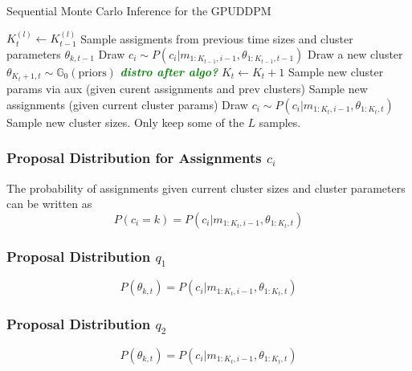 \documentclass[smallcondensed, final]{svjour3}
\newcommand{\willie}[1]{\textcolor{green}{\textsf{\emph{\textbf{\textcolor{green}{#1}}}}}}
\begin{document}
\begin{algorithm}
\caption{Sequential Monte Carlo Inference for the GPUDDPM}
\label{alg:SMC}
\begin{algorithmic}[1]
\STATE $K_{t}^{(l)}  \leftarrow K_{t-1}^{(l)}$
\STATE Sample assigments from previous time sizes and cluster parameters $\theta_{k,t-1}$
\STATE Draw $c_{i} \sim P(c_{i} | m_{1:K_{t-1}, i-1}, \theta_{1:K_{t-1}, t-1} )$
\STATE Draw a new cluster $\theta_{K_{t}+1,t} \sim \mathbb{G}_{0}(\text{priors})$   \willie{distro after algo?}
\STATE $K_{t} \leftarrow K_{t} + 1$
\ENDIF
\ENDFOR
{}
\STATE Sample new cluster params via aux (given curent assignments and prev clusters)
\ENDFOR
{}
\STATE Sample new assignments (given current cluster params)
\STATE Draw $c_{i} \sim P(c_{i} | m_{1:K_{t}, i-1}, \theta_{1:K_{t}, t} )$
\ENDFOR
\STATE Sample new cluster sizes.
\ENDFOR
\ENDFOR
\STATE Only keep some of the $L$ samples.
\ENDFOR
\end{algorithmic}
\end{algorithm}


\subsubsection{Proposal Distribution for Assignments $c_{i}$}
The probability of assignments given current cluster sizes and cluster parameters can be written as
\begin{equation}
P(c_{i} = k) = P(c_{i} | m_{1:K_{t}, i-1}, \theta_{1:K_{t}, t} )
\end{equation}


\subsubsection{Proposal Distribution $q_{1}$}

\begin{equation}
P(\theta_{k,t}) = P(c_{i} | m_{1:K_{t}, i-1}, \theta_{1:K_{t}, t} )
\end{equation}


\subsubsection{Proposal Distribution $q_{2}$}

\begin{equation}
P(\theta_{k,t}) = 	P(c_{i} | m_{1:K_{t}, i-1}, \theta_{1:K_{t}, t} )
\end{equation}
\end{document}
